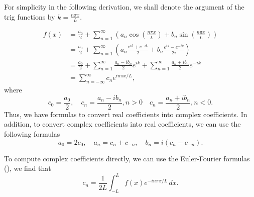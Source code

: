 For simplicity in the following derivation, we shall denote the argument of the trig functions by $k = \frac{n\pi x}{L}$.

\begin{align*}
	f(x) &= \frac{a_0}{2} + \sum_{n=1}^{\infty} \left(a_n \cos{\left(\frac{n\pi x}{L}\right)} + b_n \sin{\left(\frac{n\pi x}{L}\right)}\right) \\
	&= \frac{a_0}{2} + \sum_{n=1}^{\infty} \left(a_n \frac{e^{ik} + e^{-ik}}{2} + b_n \frac{e^{ik} - e^{-ik}}{2i}\right) \\
	&= \frac{a_0}{2} + \sum_{n=1}^{\infty} \frac{a_n - ib_n}{2} e^{ik} + \sum_{n=1}^{\infty} \frac{a_n + ib_n}{2} e^{-ik} \\
	&= \sum_{n=-\infty}^{\infty} c_n e^{in\pi x/L},
\end{align*}
where
\[
c_0 = \frac{a_0}{2}, \quad c_n = \frac{a_n - ib_n}{2}, n>0 \quad c_n = \frac{a_n + ib_n}{2}, n<0.
\]
Thus, we have formulas to convert real coefficients into complex coefficients. In addition, to convert complex coefficients into real coefficients, we can use the following formulas
\[
a_0 = 2c_0, \quad a_n = c_n + c_{-n}, \quad b_n = i(c_n - c_{-n}).
\]

To compute complex coefficients directly, we can use the Euler-Fourier formulas (), we find that
\begin{equation}\label{eq:fouriercomplexcoeffs}
	c_n = \frac{1}{2L} \int_{-L}^L f(x) e^{-in\pi x/L} \,dx.
\end{equation}

